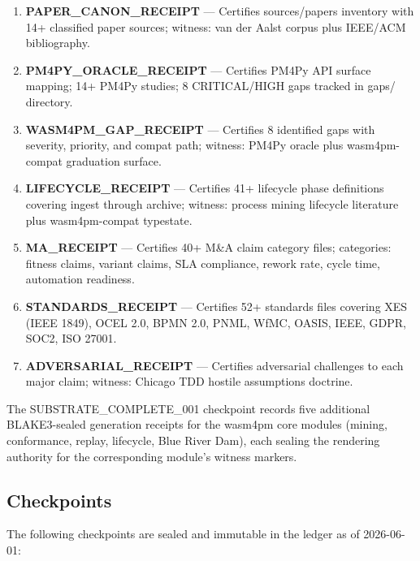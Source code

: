 \begin{enumerate}
  \item \textbf{PAPER\_CANON\_RECEIPT} --- Certifies sources/papers inventory with 14+ classified
        paper sources; witness: van der Aalst corpus plus IEEE/ACM bibliography.
  \item \textbf{PM4PY\_ORACLE\_RECEIPT} --- Certifies PM4Py API surface mapping; 14+ PM4Py studies;
        8 CRITICAL/HIGH gaps tracked in gaps/ directory.
  \item \textbf{WASM4PM\_GAP\_RECEIPT} --- Certifies 8 identified gaps with severity, priority, and
        compat path; witness: PM4Py oracle plus wasm4pm-compat graduation surface.
  \item \textbf{LIFECYCLE\_RECEIPT} --- Certifies 41+ lifecycle phase definitions covering ingest
        through archive; witness: process mining lifecycle literature plus wasm4pm-compat typestate.
  \item \textbf{MA\_RECEIPT} --- Certifies 40+ M\&A claim category files; categories: fitness
        claims, variant claims, SLA compliance, rework rate, cycle time, automation readiness.
  \item \textbf{STANDARDS\_RECEIPT} --- Certifies 52+ standards files covering XES (IEEE 1849),
        OCEL 2.0, BPMN 2.0, PNML, WfMC, OASIS, IEEE, GDPR, SOC2, ISO 27001.
  \item \textbf{ADVERSARIAL\_RECEIPT} --- Certifies adversarial challenges to each major claim;
        witness: Chicago TDD hostile assumptions doctrine.
\end{enumerate}

The SUBSTRATE\_COMPLETE\_001 checkpoint records five additional BLAKE3-sealed generation receipts
for the wasm4pm core modules (mining, conformance, replay, lifecycle, Blue River Dam), each sealing
the rendering authority for the corresponding module's witness markers.

\subsection{Checkpoints}
\label{sec:checkpoints-evidence-checkpoints}

The following checkpoints are sealed and immutable in the ledger as of 2026-06-01:

